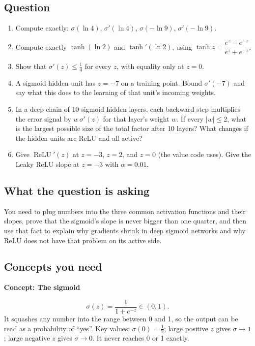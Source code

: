 \documentclass[12pt,a4paper]{article}
\newcommand{\concept}[2]{\par\medskip\phantomsection\label{#1}{\large\bfseries\color{blue!50!black} Concept: #2}\par}
\newcommand{\relu}{\operatorname{ReLU}}
\begin{document}
\subsection*{Question}
\begin{enumerate}[label=(\alph*)]
\item Compute exactly: $\sigma(\ln 4)$, $\sigma'(\ln 4)$, $\sigma(-\ln 9)$, $\sigma'(-\ln 9)$.
\item Compute exactly $\tanh(\ln 2)$ and $\tanh'(\ln 2)$, using $\tanh z = \dfrac{e^z-e^{-z}}{e^z+e^{-z}}$.
\item Show that $\sigma'(z)\le \tfrac14$ for every $z$, with equality only at $z=0$.
\item A sigmoid hidden unit has $z=-7$ on a training point. Bound $\sigma'(-7)$ and say what this does to the learning of that unit's incoming weights.
\item In a deep chain of 10 sigmoid hidden layers, each backward step multiplies the error signal by $w\,\sigma'(z)$ for that layer's weight $w$. If every $|w|\le 2$, what is the largest possible size of the total factor after 10 layers? What changes if the hidden units are ReLU and all active?
\item Give $\relu'(z)$ at $z=-3$, $z=2$, and $z=0$ (the value code uses). Give the Leaky ReLU slope at $z=-3$ with $\alpha=0.01$.
\end{enumerate}

\subsection*{What the question is asking}
You need to plug numbers into the three common activation functions and their slopes, prove that the sigmoid's slope is never bigger than one quarter, and then use that fact to explain why gradients shrink in deep sigmoid networks and why ReLU does not have that problem on its active side.

\subsection*{Concepts you need}

\concept{c:sigmoid}{The sigmoid}
\[
\sigma(z)=\frac{1}{1+e^{-z}} \in (0,1).
\]
It squashes any number into the range between 0 and 1, so the output can be read as a probability of ``yes''. Key values: $\sigma(0)=\tfrac12$; large positive $z$ gives $\sigma\to1$; large negative $z$ gives $\sigma\to0$. It never reaches 0 or 1 exactly.
\end{document}
